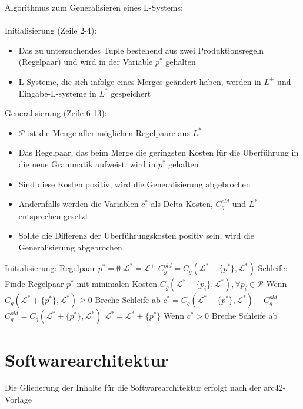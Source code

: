 Algorithmus zum Generalisieren eines L-Systems:\\~\\
Initialisierung (Zeile 2-4):
\begin{itemize}
    \item Das zu untersuchendes Tuple bestehend aus zwei Produktionsregeln (Regelpaar) und wird in der Variable $p^*$ gehalten
    \item L-Systeme, die sich infolge eines Merges geändert haben, werden in $L^+$ und Eingabe-L-systeme in $L^*$ gespeichert
\end{itemize}
Generalisierung (Zeile 6-13):
\begin{itemize}
    \item $\mathcal{P}$ ist die Menge aller möglichen Regelpaare aus $L^*$
    \item Das Regelpaar, das beim Merge die geringsten Kosten für die Überführung in die neue Grammatik aufweist, wird in
    $p^*$ gehalten
    \item Sind diese Kosten positiv, wird die Generalisierung abgebrochen
    \item Andernfalls werden die Variablen $c^*$ als Delta-Kosten, $C^{old}_g$ und $L^*$ entsprechen gesetzt
    \item Sollte die Differenz der Überführungskosten positiv sein, wird die Generalisierung abgebrochen
\end{itemize}

\begin{algorithm}[caption={Generalisieren eines L-Systems mit Gewichtung $w_0$}]
Initialisierung:
Regelpaar $p^* = \emptyset$
$\mathcal{L}^* = \mathcal{L}^+$
$C_g^{old} = C_g(\mathcal{L}^* + \{p^*\}, \mathcal{L}^*)$
Schleife:
Finde Regelpaar $p^*$ mit minimalen Kosten $C_g(\mathcal{L}^* + \{p_i\}, \mathcal{L}^*), \forall p_i \in \mathcal{P}$
Wenn $C_g(\mathcal{L}^* + \{p^*\}, \mathcal{L}^*) \geq 0$
Breche Schleife ab
$c^* = C_g(\mathcal{L}^* + \{p^*\}, \mathcal{L}^*) - C_g^{old}$
$C_g^{old} = C_g(\mathcal{L}^* + \{p^*\}, \mathcal{L}^*)$
$\mathcal{L}^* = \mathcal{L}^* + \{p^*\}$
Wenn $c^* > 0$
Breche Schleife ab
\end{algorithm}

\newpage

\section{Softwarearchitektur}
Die Gliederung der Inhalte für die Softwarearchitektur erfolgt nach der arc42-Vorlage~\cite{arc42}

